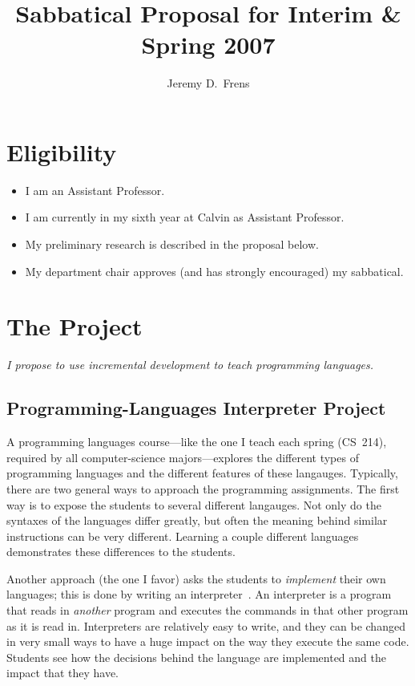 \documentclass{article}
\title{Sabbatical Proposal for Interim \& Spring 2007}
\author{Jeremy D.\ Frens}
\date{}
\begin{document}
\maketitle

\section*{Eligibility}

\begin{itemize}
\item I am an Assistant Professor.
\item I am currently in my sixth year at Calvin as Assistant Professor.
\item My preliminary research is described in the proposal below.
\item My department chair approves (and has strongly encouraged) my sabbatical.
\end{itemize}

\section*{The Project}

\emph{I propose to use incremental development to teach programming languages.}

\subsection*{Programming-Languages Interpreter Project}

A programming languages course---like the one I teach each spring (CS~214), required by all computer-science majors---explores the different types of programming languages and the different features of these langauges.  Typically, there are two general ways to approach the programming assignments.  The first way is to expose the students to several different langauges.  Not only do the syntaxes of the languages differ greatly, but often the meaning behind similar instructions can be very different.  Learning a couple different languages demonstrates these differences to the students.

Another approach (the one I favor) asks the students to \emph{implement} their own languages; this is done by writing an interpreter~\cite{eopl}.  An interpreter is a program that reads in \emph{another} program and executes the commands in that other program as it is read in.  Interpreters are relatively easy to write, and they can be changed in very small ways to have a huge impact on the way they execute the same code.  Students see how the decisions behind the language are implemented and the impact that they have.
\end{document}
